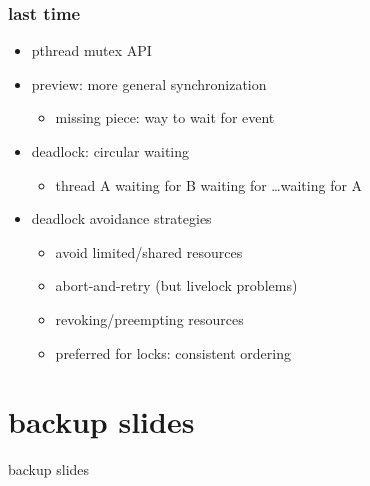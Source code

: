 \date{}
\title{}
\date{}

\begin{frame}
    \titlepage
\end{frame}



\begin{frame}
\frametitle{last time}
    \begin{itemize}
    \item pthread mutex API
    \item preview: more general synchronization
        \begin{itemize}
        \item missing piece: way to wait for event
        \end{itemize}
    \item deadlock: circular waiting
        \begin{itemize}
        \item thread A waiting for B waiting for \ldots waiting for A
        \end{itemize}
    \item deadlock avoidance strategies
        \begin{itemize}
        \item avoid limited/shared resources
        \item abort-and-retry (but livelock problems)
        \item revoking/preempting resources
        \item preferred for locks: consistent ordering
        \end{itemize}
    \end{itemize}
\end{frame}




\section{backup slides}
\begin{frame}{backup slides}
\end{frame}


